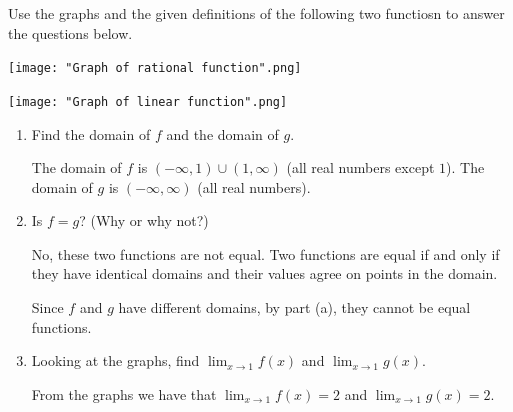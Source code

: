 \documentclass[nooutcomes]{ximera}
\begin{document}
\begin{problem}
Use the graphs and the given definitions of the following two functiosn to answer the questions below.
	
	\begin{image}

    \texttt{[image: "Graph of rational function".png]}
  \end{image}
\begin{image}
        \texttt{[image: "Graph of linear function".png]}
  \end{image}

	\begin{enumerate}
	
	  \item Find the domain of $f$ and the domain of $g$.
      \begin{freeResponse}
        The domain of $f$ is $(-\infty, 1) \cup (1, \infty)$ (all real numbers except $1$).
        The domain of $g$ is $(-\infty, \infty)$ (all real numbers).
      \end{freeResponse}
	
  	\item Is $f = g$?
      (Why or why not?)
      \begin{freeResponse}
        No, these two functions are not equal.
        Two functions are equal if and only if they have identical domains and their values agree on points in the domain.

        Since $f$ and $g$ have different domains, by part (a), they cannot be equal functions.
	\end{freeResponse}
	
	 \item  Looking at the graphs, find $\lim_{x \to 1} f(x)$ and $\lim_{x \to 1} g(x)$.
      \begin{freeResponse}
        From the graphs we have that $\lim_{x \to 1} f(x) = 2$ and $\lim_{x \to 1} g(x) = 2$.
      \end{freeResponse}

	\end{enumerate}
\end{problem}
			
\end{document}
